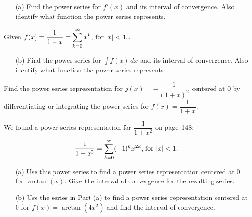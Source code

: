\documentclass[12pt]{article}
\begin{document}
\begin{enumerate}
\item[(a)] Find the power series for $f'(x)$ and its  interval of convergence. Also identify what function the power series represents.

\vfill

\end{enumerate}

\newpage

\ExampleCont Given $f(x)=\dfrac{1}{1-x}=\displaystyle\sum_{k=0}^\infty x^k$, for $|x|<1$\dots 

\begin{enumerate}
\item[(b)] Find the power series for $\int f(x)\,dx$ and its interval of convergence. Also identify what function the power series represents.

\vfill
\end{enumerate}




\Example Find the power series representation for $g(x)=-\dfrac{1}{(1+x)^2}$ centered at $0$ by differentiating or integrating the power series for $f(x)=\dfrac{1}{1+x}$.

\vfill

\newpage

\Example We found a power series representation for $\dfrac{1}{1+x^2}$ on page~148:
$$\dfrac{1}{1+x^2}=\displaystyle\sum_{k=0}^\infty (-1)^k x^{2k}\text{, for }|x|<1.$$

\begin{enumerate}
\item[(a)] Use this power series to find a power series representation centered at $0$ for $\arctan(x)$. Give the interval of convergence for the resulting series.

\vfill

\item[(b)] Use the series in Part (a) to find a power series representation centered at $0$ for \mbox{$f(x)=\arctan(4x^2)$} and find the interval of convergence.

\vfill
\end{enumerate}
\end{document}
